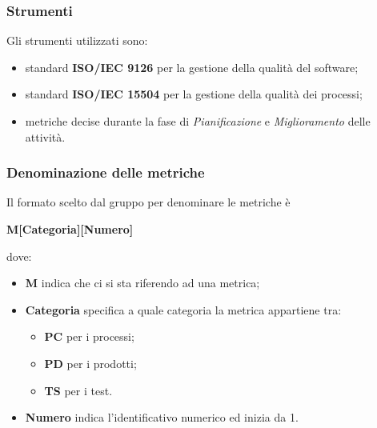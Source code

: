\subsubsection{Strumenti}
Gli strumenti utilizzati sono:
\begin{itemize}
	\item standard \textbf{ISO/IEC 9126} per la gestione della qualità del software;
	\item standard \textbf{ISO/IEC 15504} per la gestione della qualità dei processi;
	\item metriche decise durante la fase di \textit{Pianificazione} e \textit{Miglioramento} delle attività.
\end{itemize}

\subsubsection{Denominazione delle metriche}
Il formato scelto dal gruppo per denominare le metriche è
\begin{center}
	\textbf{M[Categoria][Numero]}
\end{center}
dove:
\begin{itemize}
\item \textbf{M} indica che ci si sta riferendo ad una metrica;
\item \textbf{Categoria} specifica a quale categoria la metrica appartiene tra:
	\begin{itemize}
	\item \textbf{PC} per i processi;
	\item \textbf{PD} per i prodotti;
	\item \textbf{TS} per i test.
	\end{itemize}
\item \textbf{Numero} indica l'identificativo numerico ed inizia da 1.
\end{itemize}